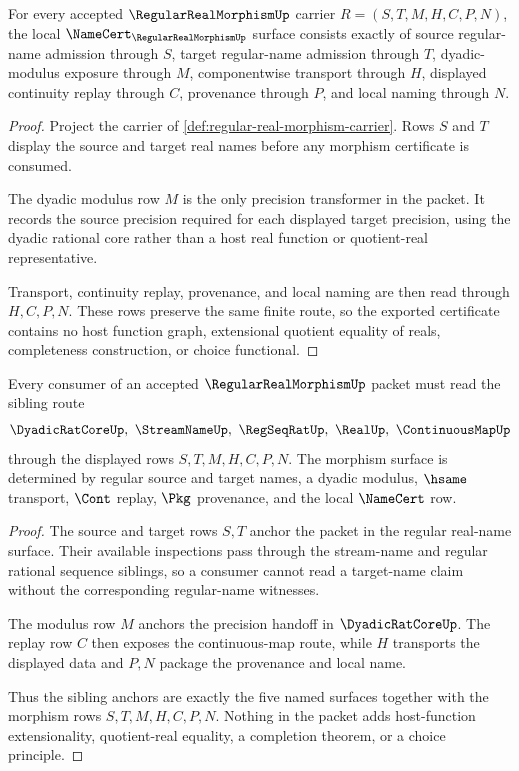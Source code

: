 \begin{theorem}
\label{thm:regular-real-morphism-namecert-surface}
For every accepted $\RegularRealMorphismUp$ carrier $R=(S,T,M,H,C,P,N)$, the local $\NameCert_{\RegularRealMorphismUp}$ surface consists exactly of source regular-name admission through $S$, target regular-name admission through $T$, dyadic-modulus exposure through $M$, componentwise transport through $H$, displayed continuity replay through $C$, provenance through $P$, and local naming through $N$.
\end{theorem}
\begin{proof}
Project the carrier of \autoref{def:regular-real-morphism-carrier}. Rows $S$ and $T$ display the source and target real names before any morphism certificate is consumed.

The dyadic modulus row $M$ is the only precision transformer in the packet. It records the source precision required for each displayed target precision, using the dyadic rational core rather than a host real function or quotient-real representative.

Transport, continuity replay, provenance, and local naming are then read through $H,C,P,N$. These rows preserve the same finite route, so the exported certificate contains no host function graph, extensional quotient equality of reals, completeness construction, or choice functional.
\end{proof}

\begin{theorem}
\label{thm:regular-real-morphism-sibling-anchors}
Every consumer of an accepted $\RegularRealMorphismUp$ packet must read the sibling route
$$
\DyadicRatCoreUp,\ \StreamNameUp,\ \RegSeqRatUp,\ \RealUp,\ \ContinuousMapUp
$$
through the displayed rows $S,T,M,H,C,P,N$. The morphism surface is determined by regular source and target names, a dyadic modulus, $\hsame$ transport, $\Cont$ replay, $\Pkg$ provenance, and the local $\NameCert$ row.
\end{theorem}
\begin{proof}
The source and target rows $S,T$ anchor the packet in the regular real-name surface. Their available inspections pass through the stream-name and regular rational sequence siblings, so a consumer cannot read a target-name claim without the corresponding regular-name witnesses.

The modulus row $M$ anchors the precision handoff in $\DyadicRatCoreUp$. The replay row $C$ then exposes the continuous-map route, while $H$ transports the displayed data and $P,N$ package the provenance and local name.

Thus the sibling anchors are exactly the five named surfaces together with the morphism rows $S,T,M,H,C,P,N$. Nothing in the packet adds host-function extensionality, quotient-real equality, a completion theorem, or a choice principle.
\end{proof}

